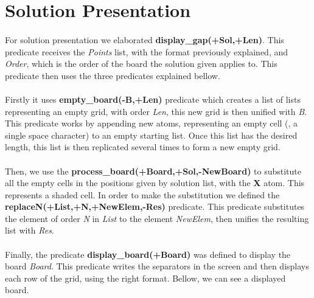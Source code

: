 \documentclass[runningheads]{llncs}
\begin{document}
\section{Solution Presentation}
\paragraph{}
For solution presentation we elaborated \textbf{display\_gap(+Sol,+Len)}. This predicate receives the \textit{Points}
list, with the format previously explained, and \textit{Order}, which is the order of the board the solution given applies to.
This predicate then uses the three predicates explained bellow.

\paragraph{}
Firstly it uses \textbf{empty\_board(-B,+Len)} predicate which creates a list of lists representing an empty grid, with order \textit{Len},
this new grid is then unified with \textit{B}.
This predicate works by appending new atoms, representing an empty cell (\textbf{\textquotesingle \textquotesingle},
a single space character) to an empty starting list. Once this list has the desired length, this list is then replicated
several times to form a new empty grid.

\paragraph{}
Then, we use the \textbf{process\_board(+Board,+Sol,-NewBoard)} to substitute all the empty cells in the positions given
by solution list, with the \textbf{\textquotesingle X \textquotesingle} atom.
This represents a shaded cell. In order to make the substitution we defined
the \textbf{replaceN(+List,+N,+NewElem,-Res)} predicate. This predicate substitutes the element of order \textit{N} in
\textit{List} to the element \textit{NewElem}, then unifies the resulting list with \textit{Res}.

\paragraph{}
Finally, the predicate \textbf{display\_board(+Board)} was defined to display the board \textit{Board}. This predicate
writes the separators in the screen and then displays each row of the grid, using the right format. Bellow, we can see a
displayed board.
\end{document}

